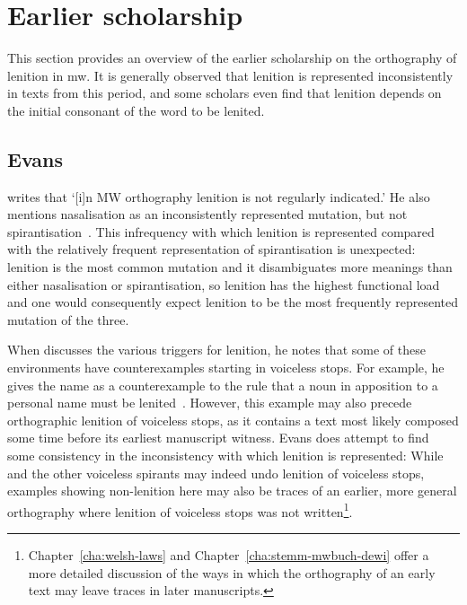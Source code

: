 \section{Earlier scholarship}
\label{sec:earlier-literature}
This section provides an overview of the earlier scholarship on the orthography of lenition in \gls{mw}. It is generally observed that lenition is represented inconsistently in texts from this period, and some scholars even find that lenition depends on the initial consonant of the word to be lenited.

\subsection{Evans}
\label{sec:evans}

\Textcite[§~18]{evans_grammar_1964} writes that `[i]n MW orthography lenition is not regularly indicated.' He also mentions nasalisation as an inconsistently represented mutation, but not spirantisation~\autocite[§§~24--25]{evans_grammar_1964}. This infrequency with which lenition is represented compared with the relatively  frequent representation of  spirantisation is unexpected:  lenition is the most common mutation  and it disambiguates more meanings than either nasalisation or spirantisation, so lenition has the highest functional load and one would consequently expect lenition to be the most frequently represented mutation of the three.

When \textcite{evans_grammar_1964} discusses the various triggers for lenition, he notes that some of these environments have counterexamples starting in voiceless stops. For example, he gives the name   as a counterexample to the rule that a noun in apposition to a personal name must be lenited~\autocite[§~19]{evans_grammar_1964}. However, this example may also precede orthographic lenition of voiceless stops, as it contains a text most likely composed some time before its earliest manuscript witness. Evans does attempt to find some consistency in the inconsistency with which lenition is represented:
While  and the other voiceless spirants may indeed undo lenition of voiceless stops, examples showing non-lenition here may also be traces of an earlier, more general orthography where lenition of voiceless stops was not written\footnote{Chapter~\ref{cha:welsh-laws} and Chapter~\ref{cha:stemm-mwbuch-dewi} offer a more detailed discussion of the ways in which the orthography of an early text may leave traces in later manuscripts.}.

